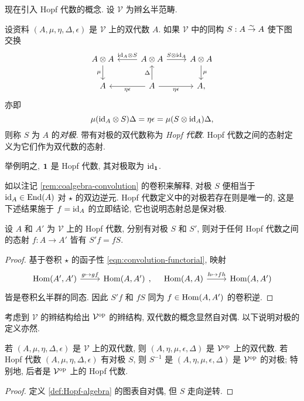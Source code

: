 现在引入 Hopf 代数的概念. 设 $\mathcal{V}$ 为辫幺半范畴.

\begin{definition}\label{def:Hopf-algebra}
	设资料 $(A, \mu, \eta, \Delta, \epsilon)$ 是 $\mathcal{V}$ 上的双代数 $A$. 如果 $\mathcal{V}$ 中的同构 $S: A \stackrel{\sim}{\rightarrow} A$ 使下图交换
	\[\begin{tikzcd}
		A \otimes A \arrow[d, "\mu"'] & A \otimes A \arrow[r, "{S \otimes \identity_A}"] \arrow[l, "{\identity_A \otimes S}"'] & A \otimes A \arrow[d, "\mu"] \\
		A & A \arrow[u, "\Delta"] \arrow[r, "\eta\epsilon"'] \arrow[l, "\eta\epsilon"] & A ,
	\end{tikzcd}\]
	亦即
	\[ \mu (\mathrm{id}_A \otimes S) \Delta = \eta\epsilon = \mu (S \otimes \mathrm{id}_A) \Delta, \]
	则称 $S$ 为 $A$ 的\emph{对极}. 带有对极的双代数称为 \emph{Hopf 代数}. Hopf 代数之间的态射定义为它们作为双代数的态射.
\end{definition}

举例明之, $\bm{1}$ 是 Hopf 代数, 其对极取为 $\mathrm{id}_{\bm{1}}$.

如以注记 \ref{rem:coalgebra-convolution} 的卷积来解释, 对极 $S$ 便相当于 $\mathrm{id}_A \in \operatorname{End}(A)$ 对 $\star$ 的双边逆元. Hopf 代数定义中的对极若存在则是唯一的, 这是下述结果施于 $f = \mathrm{id}_A$ 的立即结论, 它也说明态射总是保对极.

\begin{proposition}\label{prop:antipode-homo}
	设 $A$ 和 $A'$ 为 $\mathcal{V}$ 上的 Hopf 代数, 分别有对极 $S$ 和 $S'$, 则对于任何 Hopf 代数之间的态射 $f: A \to A'$ 皆有 $S' f = f S$.
\end{proposition}
\begin{proof}
	基于卷积 $\star$ 的函子性 \eqref{eqn:convolution-functorial}, 映射
	\[\begin{tikzcd}
		\Hom(A', A') \arrow[r, "{g \mapsto gf}"] & \Hom(A, A')
	\end{tikzcd}, \quad \begin{tikzcd}
		\Hom(A, A) \arrow[r, "{h \mapsto fh}"] & \Hom(A, A')
	\end{tikzcd}\]
	皆是卷积幺半群的同态. 因此 $S'f$ 和 $fS$ 同为 $f \in \operatorname{Hom}(A, A')$ 的卷积逆.
\end{proof}

考虑到 $\mathcal{V}$ 的辫结构给出 $\mathcal{V}^{\operatorname{op}}$ 的辫结构, 双代数的概念显然自对偶. 以下说明对极的定义亦然.

\begin{proposition}\label{prop:bialgebra-duality}
	若 $(A, \mu, \eta, \Delta, \epsilon)$ 是 $\mathcal{V}$ 上的双代数, 则 $(A, \eta, \mu, \epsilon, \Delta)$ 是 $\mathcal{V}^{\operatorname{op}}$ 上的双代数. 若 Hopf 代数 $(A, \mu, \eta, \Delta, \epsilon)$ 有对极 $S$, 则 $S^{-1}$ 是 $(A, \eta, \mu, \epsilon, \Delta)$ 是 $\mathcal{V}^{\operatorname{op}}$ 的对极; 特别地, 后者是 $\mathcal{V}^{\operatorname{op}}$ 上的 Hopf 代数.
\end{proposition}
\begin{proof}
	定义 \ref{def:Hopf-algebra} 的图表自对偶, 但 $S$ 走向逆转.
\end{proof}

